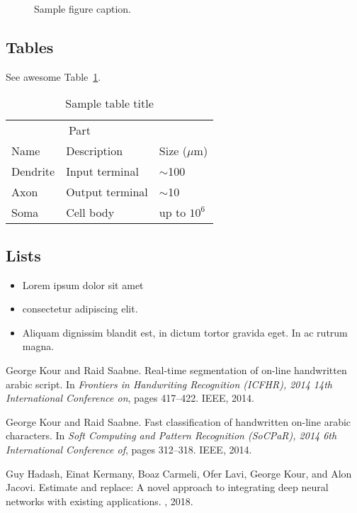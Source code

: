 \documentclass{article}
\begin{document}
\begin{figure}
  \centering
  \fbox{\rule[-.5cm]{4cm}{4cm} \rule[-.5cm]{4cm}{0cm}}
  \caption{Sample figure caption.}
  \label{fig:fig1}
\end{figure}

\subsection{Tables}
\lipsum[12]
See awesome Table~\ref{tab:table}.

\begin{table}
 \caption{Sample table title}
  \centering
  \begin{tabular}{lll}
    \toprule
    \multicolumn{2}{c}{Part}                   \\
    \cmidrule(r){1-2}
    Name     & Description     & Size ($\mu$m) \\
    \midrule
    Dendrite & Input terminal  & $\sim$100     \\
    Axon     & Output terminal & $\sim$10      \\
    Soma     & Cell body       & up to $10^6$  \\
    \bottomrule
  \end{tabular}
  \label{tab:table}
\end{table}

\subsection{Lists}
\begin{itemize}
\item Lorem ipsum dolor sit amet
\item consectetur adipiscing elit. 
\item Aliquam dignissim blandit est, in dictum tortor gravida eget. In ac rutrum magna.
\end{itemize}


  


\begin{thebibliography}{1}

George Kour and Raid Saabne.
\newblock Real-time segmentation of on-line handwritten arabic script.
\newblock In {\em Frontiers in Handwriting Recognition (ICFHR), 2014 14th
  International Conference on}, pages 417--422. IEEE, 2014.

George Kour and Raid Saabne.
\newblock Fast classification of handwritten on-line arabic characters.
\newblock In {\em Soft Computing and Pattern Recognition (SoCPaR), 2014 6th
  International Conference of}, pages 312--318. IEEE, 2014.

Guy Hadash, Einat Kermany, Boaz Carmeli, Ofer Lavi, George Kour, and Alon
  Jacovi.
\newblock Estimate and replace: A novel approach to integrating deep neural
  networks with existing applications.
, 2018.

\end{thebibliography}
\end{document}

